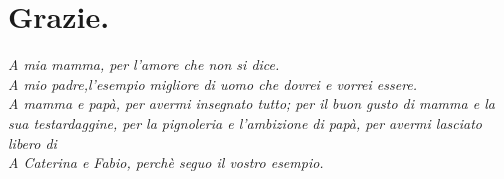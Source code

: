 \documentclass[]{article}
\begin{document}
\break

\section*{Grazie.}
\vspace{1cm}

\textit{A mia mamma, per l'amore che non si dice.\\
A mio padre,l'esempio migliore di uomo che dovrei e vorrei essere.\\
A mamma e papà, per avermi insegnato tutto; per il buon gusto di mamma e la sua testardaggine, per la pignoleria e l'ambizione di papà, per avermi lasciato libero di \\
A Caterina e Fabio, perchè seguo il vostro esempio.}
\end{document}
